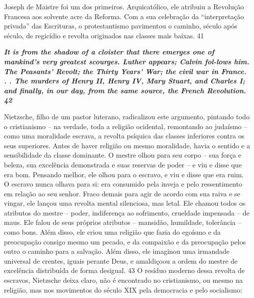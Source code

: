 \par
 
Joseph de Maistre foi um dos primeiros. Arquicatólico, ele atribuiu a Revolução Francesa aos solvente acre da Reforma. Com a sua celebração da “interpretação privada” das Escrituras, o protestantismo pavimentou o caminho, século após século, de regicídio e revolta originados nas classes mais baixas. 41
 
\par
 

 \textbf{\textit{It is from the shadow of a cloister that there emerges one of mankind’s very greatest scourges. Luther appears; Calvin fol-lows him. The Peasants’ Revolt; the Thirty Years’ War; the civil war in France. . . The murders of Henry II, Henry IV, Mary Stuart, and Charles I; and finally, in our day, from the same source, the French Revolution. {{\color{blue} 42} } } }  
 
 
\par
 
Nietzsche, filho de um pastor luterano, radicalizou este argumento, pintando todo o cristianismo – na verdade, toda a religião ocidental, remontando ao judaísmo – como uma moralidade escrava, a revolta psíquica das classes inferiores contra os seus superiores. Antes de haver religião ou mesmo moralidade, havia o sentido e a sensibilidade da classe dominante. O mestre olhou para seu corpo – sua força e beleza, sua excelência demonstrada e suas reservas de poder – e viu e disse que era bom. Pensando melhor, ele olhou para o escravo, e viu e disse que era ruim. O escravo nunca olhava para si: era consumido pela inveja e pelo ressentimento em relação ao seu senhor. Fraco demais para agir de acordo com sua raiva e se vingar, ele lançou uma revolta mental silenciosa, mas letal. Ele chamou todos os atributos do mestre – poder, indiferença ao sofrimento, crueldade impensada – de maus. Ele falou de seus próprios atributos – mansidão, humildade, tolerância – como bons. Além disso, ele criou uma religião que fazia do egoísmo e da preocupação consigo mesmo um pecado, e da compaixão e da preocupação pelos outro o caminho para a salvação. Além disso, ele imaginou uma irmandade universal de crentes, iguais perante Deus, e amaldiçoou a ordem do mestre de excelência distribuída de forma desigual.
 {\color{blue} 43}  
O resíduo moderno dessa revolta de escravos, Nietzsche deixa claro, não é encontrado no cristianismo, ou mesmo na religião, mas nos movimentos do século XIX pela democracia e pelo socialismo:
 
\par
 

